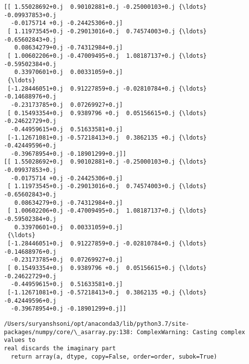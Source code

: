 \documentclass[11pt]{article}
\makeatletter
\newcommand{\boxspacing}{\kern\kvtcb@left@rule\kern\kvtcb@boxsep}
\newcommand{\prompt}[4]{
        \ttfamily\llap{{\color{#2}[#3]:\hspace{3pt}#4}}\vspace{-\baselineskip}
    }
\makeatother
\begin{document}
    \begin{Verbatim}[commandchars=\\\{\}]
[[ 1.55028692+0.j  0.90102881+0.j -0.25000103+0.j {\ldots} -0.09937853+0.j
  -0.0175714 +0.j -0.24425306+0.j]
 [ 1.11973545+0.j -0.29013016+0.j  0.74574003+0.j {\ldots} -0.65602843+0.j
   0.08634279+0.j -0.74312984+0.j]
 [ 1.00602206+0.j -0.47009495+0.j  1.08187137+0.j {\ldots} -0.59502384+0.j
   0.33970601+0.j  0.00331059+0.j]
 {\ldots}
 [-1.28446051+0.j  0.91227859+0.j -0.02810784+0.j {\ldots} -0.14688976+0.j
  -0.23173785+0.j  0.07269927+0.j]
 [ 0.15493354+0.j  0.9389796 +0.j  0.05156615+0.j {\ldots} -0.24622729+0.j
  -0.44959615+0.j  0.51633581+0.j]
 [-1.12671081+0.j -0.57218413+0.j  0.3862135 +0.j {\ldots} -0.42449596+0.j
  -0.39678954+0.j -0.18901299+0.j]]
[[ 1.55028692+0.j  0.90102881+0.j -0.25000103+0.j {\ldots} -0.09937853+0.j
  -0.0175714 +0.j -0.24425306+0.j]
 [ 1.11973545+0.j -0.29013016+0.j  0.74574003+0.j {\ldots} -0.65602843+0.j
   0.08634279+0.j -0.74312984+0.j]
 [ 1.00602206+0.j -0.47009495+0.j  1.08187137+0.j {\ldots} -0.59502384+0.j
   0.33970601+0.j  0.00331059+0.j]
 {\ldots}
 [-1.28446051+0.j  0.91227859+0.j -0.02810784+0.j {\ldots} -0.14688976+0.j
  -0.23173785+0.j  0.07269927+0.j]
 [ 0.15493354+0.j  0.9389796 +0.j  0.05156615+0.j {\ldots} -0.24622729+0.j
  -0.44959615+0.j  0.51633581+0.j]
 [-1.12671081+0.j -0.57218413+0.j  0.3862135 +0.j {\ldots} -0.42449596+0.j
  -0.39678954+0.j -0.18901299+0.j]]
    \end{Verbatim}

    \begin{Verbatim}[commandchars=\\\{\}]
/Users/suryanshsoni/opt/anaconda3/lib/python3.7/site-
packages/numpy/core/\_asarray.py:138: ComplexWarning: Casting complex values to
real discards the imaginary part
  return array(a, dtype, copy=False, order=order, subok=True)
    \end{Verbatim}

    \begin{center}
    \end{center}
    { \hspace*{\fill} \\}
    
    \begin{tcolorbox}[breakable, size=fbox, boxrule=1pt, pad at break*=1mm,colback=cellbackground, colframe=cellborder]
\prompt{In}{incolor}{ }{\boxspacing}
\begin{Verbatim}[commandchars=\\\{\}]

\end{Verbatim}
\end{tcolorbox}
\end{document}

